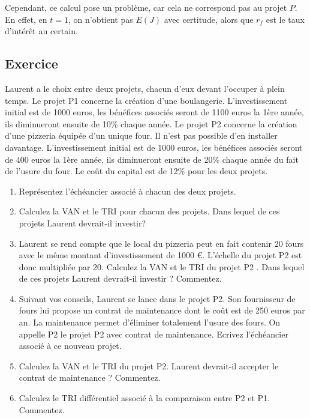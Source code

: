 \documentclass[a4paper, 12pt]{report}
\begin{document}
Cependant, ce calcul pose un problème, car cela ne correspond pas au projet \( P \). En effet, en \( t = 1 \), on n’obtient pas \( E(J) \) avec certitude, alors que \( r_f \) est le taux d’intérêt au certain.

\subsection{Exercice}

Laurent a le choix entre deux projets, chacun d'eux devant l'occuper à plein temps. Le projet   P1 concerne la création d'une boulangerie. L'investissement initial est de 1000 euros, les bénéfices associés seront de 1100 euros la 1ère année, ils diminueront ensuite de 10\% chaque année. Le projet  P2  concerne la création d’une pizzeria équipée d’un unique four. Il n'est pas possible d'en installer davantage. L'investissement initial est de 1000 euros, les bénéfices associés seront de 400 euros la 1ère année, ils diminueront ensuite de 20\% chaque année du fait de l'usure du four. Le coût du capital est de 12\% pour les deux projets.
\begin{enumerate}
	\item Représentez l'échéancier associé à chacun des deux projets.
	\item Calculez la VAN et le TRI pour chacun des projets. Dans lequel de ces projets Laurent devrait-il investir?
	\item Laurent se rend compte que le local du pizzeria peut en fait contenir 20 fours avec le même montant d'investissement de 1000 €. L'échelle du projet P2 est donc multipliée par 20. Calculez la VAN et le TRI du projet P2 . Dans lequel de ces projets  Laurent devrait-il investir ? Commentez.
	\item Suivant vos conseils, Laurent se lance dans le projet  P2. Son fournisseur de fours lui propose un contrat de maintenance dont le coût est de 250 euros par an. La maintenance permet d'éliminer totalement l'usure des fours. On appelle  P2 le projet P2  avec contrat de maintenance. Ecrivez l'échéancier associé à ce nouveau projet. 
	\item Calculez la VAN et le TRI du projet  P2. Laurent devrait-il accepter le contrat de maintenance ? Commentez.
	\item Calculez le TRI différentiel associé à la comparaison entre   P2  et P1. Commentez.
	
\end{enumerate}
\end{document}
